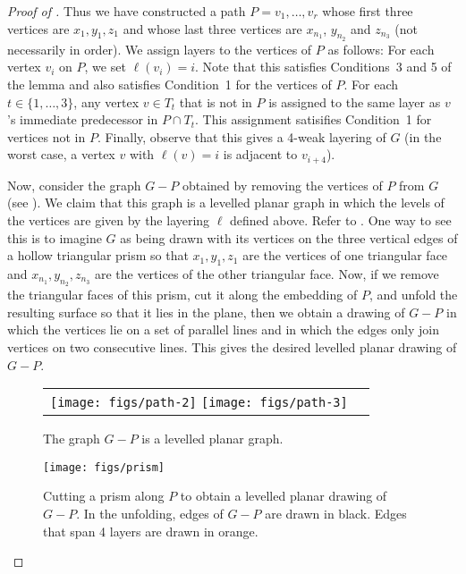 \documentclass{patmorin}
\begin{document}
\begin{proof}[Proof of ]
  Thus we have constructed a path $P=v_1,\ldots,v_r$ whose first three
  vertices are $x_1,y_1,z_1$ and whose last three vertices are $x_{n_1}$,
  $y_{n_2}$ and $z_{n_3}$ (not necessarily in order).  We assign layers
  to the vertices of $P$ as follows: For each vertex $v_i$ on $P$,
  we set $\ell(v_i)=i$.  Note that this satisfies Conditions~3 and 5
  of the lemma and also satisfies Condition~1 for the vertices of $P$.
  For each $t\in\{1,\ldots,3\}$, any vertex $v\in T_t$ that is not in
  $P$ is assigned to the same layer as $v$'s immediate predecessor in
  $P\cap T_t$.  This assignment satisifies Condition~1 for vertices not
  in $P$.  Finally, observe that this gives a 4-weak layering of $G$ (in
  the worst case, a vertex $v$ with $\ell(v)=i$ is adjacent to $v_{i+4}$).

  Now, consider the graph $G-P$ obtained by removing the vertices of $P$
  from $G$ (see ).  We claim that this graph is a levelled
  planar graph \cite{bannister.devanny.ea:track} in which the levels
  of the vertices are given by the layering $\ell$ defined above.
  Refer to .  One way to see this is to imagine $G$
  as being drawn with its vertices on the three vertical edges of
  a hollow triangular prism so that $x_1,y_1,z_1$ are the vertices of one
  triangular face and $x_{n_1},y_{n_2},z_{n_3}$ are the vertices of
  the other triangular face.  Now, if we remove the triangular faces
  of this prism, cut it along the embedding of $P$, and unfold
  the resulting surface so that it lies in the plane, then we obtain a
  drawing of $G-P$ in which the vertices lie on a set of parallel lines
  and in which the edges only join vertices on two consecutive lines.
  This gives the desired levelled planar drawing of $G-P$.

  \begin{figure}
  \begin{center}
  \begin{tabular}{cc}
  \texttt{[image: figs/path-2]}
  \texttt{[image: figs/path-3]}
  \end{tabular}
  \end{center}
  \caption{The graph $G-P$ is a levelled planar graph.}
  \end{figure}


  \begin{figure}
     \begin{center}
        \texttt{[image: figs/prism]}
     \end{center}
     \caption{Cutting a prism along $P$ to obtain a levelled planar
      drawing of $G-P$.
      In the unfolding, edges of $G-P$ are drawn in black. Edges that
      span 4 layers are drawn in orange.}
  \end{figure}


\end{proof}
\end{document}
